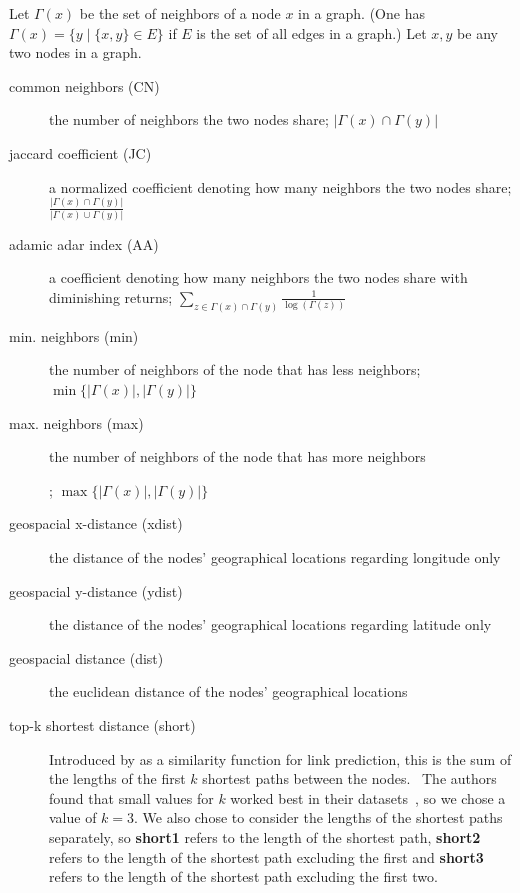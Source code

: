 \documentclass[12pt,a4paper]{IEEEtran}
\begin{document}
Let \(\Gamma(x)\) be the set of neighbors of a node \(x\) in a graph.
(One has \(\Gamma(x) = \{y \mid \{x, y\} \in E\}\) if \(E\) is the set of all edges in a graph.)
Let \(x, y\) be any two nodes in a graph.
\begin{description}
\item[common neighbors (CN)] the number of neighbors the two nodes share;
      \(|\Gamma(x) \cap \Gamma(y)|\)
\item[jaccard coefficient (JC)] a normalized coefficient denoting how many neighbors the two nodes share;\\
      \(\frac{|\Gamma(x) \cap \Gamma(y)|}{|\Gamma(x) \cup \Gamma(y)|}\)
\item[adamic adar index (AA)] a coefficient denoting how many neighbors the two nodes share with diminishing returns;
      \(\sum_{z \in \Gamma(x) \cap \Gamma(y)}\frac{1}{\log(\Gamma(z))}\)
\item[min. neighbors (min)] the number of neighbors of the node that has less neighbors\endnotemark;
      \(\min\{|\Gamma(x)|,|\Gamma(y)|\}\)
\item[max. neighbors (max)] the number of neighbors of the node that has more neighbors\addtocounter{endnote}{-1}\endnotemark;
      \(\max\{|\Gamma(x)|,|\Gamma(y)|\}\)
\item[geospacial x-distance (xdist)] the distance of the nodes' geographical locations regarding longitude only
\item[geospacial y-distance (ydist)] the distance of the nodes' geographical locations regarding latitude only
\item[geospacial distance (dist)] the euclidean distance of the nodes' geographical locations
\item[top-k shortest distance (short)] Introduced by \citeauthor{link_prediction_k_shortest}
      as a similarity function for link prediction,
      this is the sum of the lengths of the first \(k\) shortest paths between the nodes.~\cite{link_prediction_k_shortest}
      The authors found that small values for \(k\) worked best in their datasets~\cite[see][4]{link_prediction_k_shortest},
      so we chose a value of \(k = 3\).
      We also chose to consider the lengths of the shortest paths separately,
      so \textbf{short1} refers to the length of the shortest path,
      \textbf{short2} refers to the length of the shortest path excluding the first and
      \textbf{short3} refers to the length of the shortest path excluding the first two.
\end{description}
\end{document}
